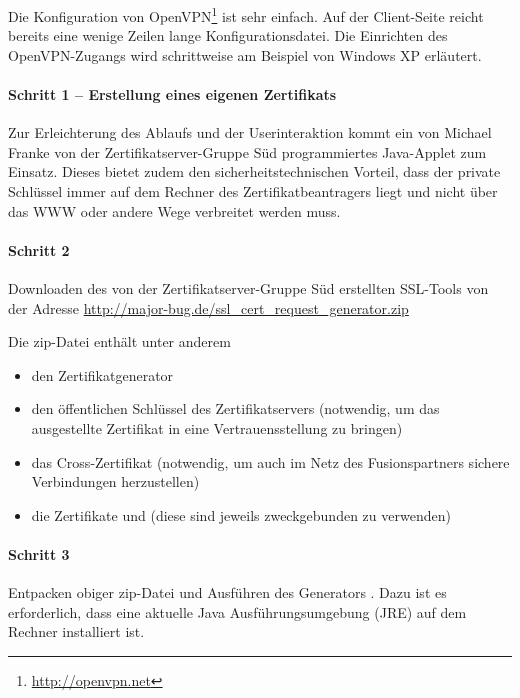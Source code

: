 Die Konfiguration von OpenVPN\footnote{\url{http://openvpn.net}} ist sehr
einfach. Auf der Client-Seite reicht bereits eine wenige Zeilen lange
Konfigurationsdatei. Die Einrichten des OpenVPN\hyp Zugangs wird schrittweise am
Beispiel von Windows XP erläutert.

\paragraph{Schritt 1 -- Erstellung eines eigenen Zertifikats}
Zur Erleichterung des Ablaufs und der Userinteraktion kommt ein von Michael
Franke von der Zertifikatserver-Gruppe Süd programmiertes Java-Applet zum
Einsatz. Dieses bietet zudem den sicherheitstechnischen Vorteil, dass der
private Schlüssel immer auf dem Rechner des Zertifikatbeantragers liegt und
nicht über das WWW oder andere Wege verbreitet werden muss.


\paragraph{Schritt 2}

Downloaden des von der Zertifikatserver-Gruppe Süd erstellten SSL-Tools von der
Adresse \url{http://major-bug.de/ssl_cert_request_generator.zip}

Die zip-Datei enthält unter anderem

\begin{itemize}
  \item den Zertifikatgenerator
  \item den öffentlichen Schlüssel  des
    Zertifikatservers (notwendig, um das ausgestellte Zertifikat in eine
    Vertrauensstellung zu bringen)
  \item das Cross-Zertifikat  (notwendig, um
    auch im Netz des Fusionspartners sichere Verbindungen herzustellen)
  \item die Zertifikate  und
     (diese sind jeweils zweckgebunden zu
    verwenden)
\end{itemize}

\paragraph{Schritt 3}

Entpacken obiger zip-Datei und Ausführen des Generators
.  Dazu ist es erforderlich, dass eine
aktuelle Java Ausführungsumgebung (JRE) auf dem Rechner installiert ist.

